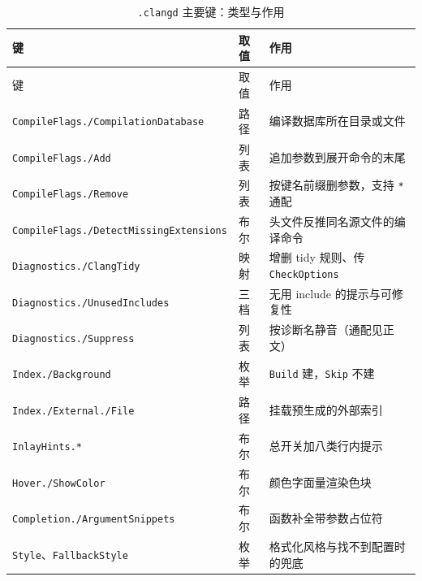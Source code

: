 \documentclass[12pt,a4paper,fontset=fandol]{ctexbook}
\begin{document}
\begin{longtable}{>{\raggedright\arraybackslash}p{}
                  >{\raggedright\arraybackslash}p{}
                  >{\raggedright\arraybackslash}p{}}
\caption{\texttt{.clangd} 主要键：类型与作用}\label{tab:ch05-keys}\\
\toprule
键 & 取值 & 作用 \\
\midrule
\endfirsthead
\toprule
键 & 取值 & 作用 \\
\midrule
\endhead
\texttt{CompileFlags./}\hspace{0pt}\texttt{Compilation}\hspace{0pt}\texttt{Database}
  & 路径 & 编译数据库所在目录或文件 \\
\midrule
\texttt{CompileFlags./}\hspace{0pt}\texttt{Add}
  & 列表 & 追加参数到展开命令的末尾 \\
\midrule
\texttt{CompileFlags./}\hspace{0pt}\texttt{Remove}
  & 列表 & 按键名前缀删参数，支持 \texttt{*} 通配 \\
\midrule
\texttt{CompileFlags./}\hspace{0pt}\texttt{Detect}\hspace{0pt}\texttt{Missing}\hspace{0pt}\texttt{Extensions}
  & 布尔 & 头文件反推同名源文件的编译命令 \\
\midrule
\texttt{Diagnostics./}\hspace{0pt}\texttt{ClangTidy}
  & 映射 & 增删 tidy 规则、传 \texttt{CheckOptions} \\
\midrule
\texttt{Diagnostics./}\hspace{0pt}\texttt{Unused}\hspace{0pt}\texttt{Includes}
  & 三档 & 无用 include 的提示与可修复性 \\
\midrule
\texttt{Diagnostics./}\hspace{0pt}\texttt{Suppress}
  & 列表 & 按诊断名静音（通配见正文） \\
\midrule
\texttt{Index./}\hspace{0pt}\texttt{Background}
  & 枚举 & \texttt{Build} 建，\texttt{Skip} 不建 \\
\midrule
\texttt{Index./}\hspace{0pt}\texttt{External./}\hspace{0pt}\texttt{File}
  & 路径 & 挂载预生成的外部索引 \\
\midrule
\texttt{InlayHints.*}
  & 布尔 & 总开关加八类行内提示 \\
\midrule
\texttt{Hover./}\hspace{0pt}\texttt{ShowColor}
  & 布尔 & 颜色字面量渲染色块 \\
\midrule
\texttt{Completion./}\hspace{0pt}\texttt{Argument}\hspace{0pt}\texttt{Snippets}
  & 布尔 & 函数补全带参数占位符 \\
\midrule
\texttt{Style}、\texttt{FallbackStyle}
  & 枚举 & 格式化风格与找不到配置时的兜底 \\
\bottomrule
\end{longtable}
\end{document}
